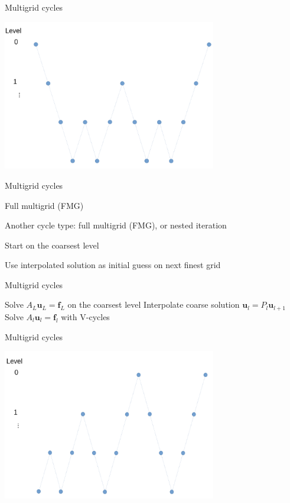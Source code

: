 \documentclass[18pt,xcolor=table]{beamer}
\begin{document}
\begin{frame}{Multigrid cycles}
\begin{center}
\includegraphics[width=0.7\textwidth]{../figures/Wcycle}
\end{center}
\end{frame}

\begin{frame}{Multigrid cycles}
\begin{block}{Full multigrid (FMG)}
\bit
\item Another cycle type: full multigrid (FMG), or nested iteration
\item Start on the coarsest level
\item Use interpolated solution as initial guess on next finest grid
\eit
\end{block}
\end{frame}

\begin{frame}{Multigrid cycles}
\begin{algorithm}[H]
\caption{Full multigrid (FMG)}
\begin{algorithmic}
\State Solve $A_L\mathbf{u}_L = \mathbf{f}_L$ on the coarsest level
\State Interpolate coarse solution $\mathbf{u}_l = P_l\mathbf{u}_{l+1}$
\State Solve $A_l\mathbf{u}_l = \mathbf{f}_l$ with V-cycles
\EndFor
\end{algorithmic}
\end{algorithm}
\end{frame}

\begin{frame}{Multigrid cycles}
\begin{center}
\includegraphics[width=0.7\textwidth]{../figures/FMGcycle}
\end{center}
\end{frame}
\end{document}
